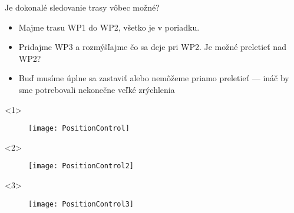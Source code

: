 \begin{frame}{Je dokonalé sledovanie trasy vôbec možné?}
\begin{itemize}
\item<1-> Majme trasu WP1 do WP2, všetko je v poriadku.
\item<2-> Pridajme WP3 a rozmýšľajme čo sa deje pri WP2. Je možné preletieť nad WP2?
\item<3-> Buď musíme úplne sa zastaviť alebo nemôžeme priamo preletieť --- ináč by sme potrebovali nekonečne veľké zrýchlenia
\end{itemize}

\begin{onlyenv}<1>
  \begin{figure}
\centering
  \texttt{[image: PositionControl]}\\
\end{figure}
\end{onlyenv}

\begin{onlyenv}<2>
  \begin{figure}
\centering
  \texttt{[image: PositionControl2]}\\
\end{figure}
\end{onlyenv}

\begin{onlyenv}<3>
  \begin{figure}
\centering
  \texttt{[image: PositionControl3]}\\
\end{figure}
\end{onlyenv}
\end{frame}
